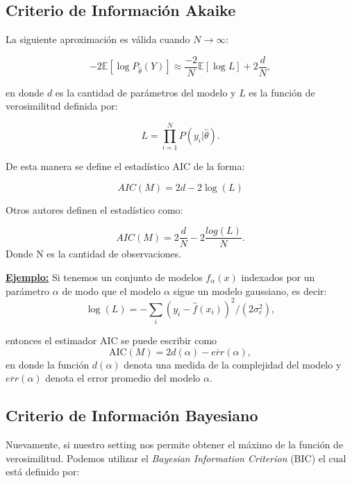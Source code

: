 \subsection{Criterio de Información Akaike}
La siguiente aproximación es válida cuando $N \to \infty$:

\begin{equation*}
-2\mathbb{E}[\log P_{\hat{\theta}}(Y)] \approx \frac{-2}{N}\mathbb{E}[\log L] + 2\frac{d}{N},
\end{equation*}

en donde $d$ es la cantidad de parámetros del modelo y  $L$ es la función de verosimilitud definida por:

\begin{equation}
L = \prod_{i=1}^N P(y_i|\hat{\theta}).
\end{equation}

De esta manera se define el estadístico AIC de la forma:

\begin{equation}
AIC(M) = 2d-2\log(L)
\end{equation}

Otros autores definen el estadístico como:

\begin{equation}
AIC(M) = 2\frac{d}{N}-2\frac{log(L)}{N}.
\end{equation}
Donde N es la cantidad de observaciones.

\textbf{\underline{Ejemplo:}} Si tenemos un conjunto de modelos $f_{\alpha}(x)$ indexados por un parámetro $\alpha$ de modo que el modelo $\alpha$ sigue un modelo gaussiano, es decir:
$$
\log(L) = -\sum_{i}(y_i-\hat{f}(x_i))^2/(2\sigma_e^2),
$$

\noindent entonces el estimador AIC se puede escribir como
\begin{equation}
\text{AIC}(M) = 2d(\alpha)-\overline{err}(\alpha),
\end{equation}
en donde la función $d(\alpha)$ denota una medida de la complejidad del modelo y $\overline{err}(\alpha)$ denota el error promedio del modelo $\alpha$.

\subsection{Criterio de Información Bayesiano}
Nuevamente, si nuestro setting nos permite obtener el máximo de la función de verosimilitud. Podemos utilizar el \emph{Bayesian Information Criterion} (BIC) el cual está definido por:

